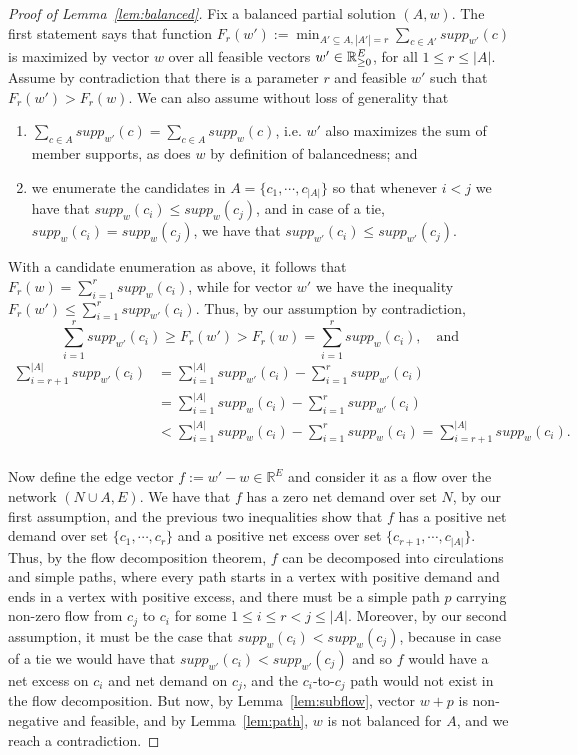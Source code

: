 \begin{proof}[Proof of Lemma~\ref{lem:balanced}]
Fix a balanced partial solution $(A,w)$. The first statement says that function 
$F_r(w'):=\min_{A'\subseteq A, |A'|=r} \sum_{c\in A'} supp_{w'}(c)$ 
is maximized by vector $w$ over all feasible vectors $w'\in\mathbb{R}_{\geq 0}^E$, for all $1\leq r\leq |A|$. 
Assume by contradiction that there is a parameter $r$ and feasible $w'$ such that $F_r(w')>F_r(w)$. 
We can also assume without loss of generality that 
\begin{enumerate}
    \item $\sum_{c\in A} supp_{w'}(c)=\sum_{c\in A} supp_{w}(c)$, i.e. $w'$ also maximizes the sum of member supports, as does $w$ by definition of balancedness; and  
    \item we enumerate the candidates in $A=\{c_1, \cdots, c_{|A|}\}$ so that whenever $i<j$ we have that $supp_w(c_i)\leq supp_w(c_j)$, and in case of a tie, $supp_w(c_i)= supp_w(c_j)$, we have that $supp_{w'}(c_i)\leq supp_{w'}(c_j)$. 
\end{enumerate}

With a candidate enumeration as above, it follows that $F_r(w)=\sum_{i=1}^r supp_w(c_i)$, while for vector $w'$ we have the inequality $F_r(w')\leq \sum_{i=1}^r supp_{w'}(c_i)$. 
Thus, by our assumption by contradiction, 
$$\sum_{i=1}^r supp_{w'}(c_i) \geq F_r(w') > F_r(w) = \sum_{i=1}^r supp_{w}(c_i), \quad \text{and}$$
\begin{align*}
    \sum_{i=r+1}^{|A|} supp_{w'}(c_i) &= \sum_{i=1}^{|A|} supp_{w'}(c_i) - \sum_{i=1}^{r} supp_{w'}(c_i) \\
    & = \sum_{i=1}^{|A|} supp_{w}(c_i) - \sum_{i=1}^{r} supp_{w'}(c_i) \\
    & < \sum_{i=1}^{|A|} supp_{w}(c_i) - \sum_{i=1}^{r} supp_{w}(c_i) 
    = \sum_{i=r+1}^{|A|} supp_{w}(c_i). \\
\end{align*}

Now define the edge vector $f:=w'-w\in\mathbb{R}^E$ and consider it as a flow over the network $(N\cup A, E)$. 
We have that $f$ has a zero net demand over set $N$, by our first assumption, and the previous two inequalities show that $f$ has a positive net demand over set $\{c_1, \cdots, c_r\}$ and a positive net excess over set $\{c_{r+1}, \cdots, c_{|A|}\}$. Thus, by the flow decomposition theorem, $f$ can be decomposed into circulations and simple paths, where every path starts in a vertex with positive demand and ends in a vertex with positive excess, and there must be a simple path $p$ carrying non-zero flow from $c_j$ to $c_i$ for some $1\leq i\leq r<j\leq |A|$. 
Moreover, by our second assumption, it must be the case that $supp_w(c_i)<supp_w(c_j)$, because in case of a tie we would have that $supp_{w'}(c_i)<supp_{w'}(c_j)$ and so $f$ would have a net excess on $c_i$ and net demand on $c_j$, and the $c_i$-to-$c_j$ path would not exist in the flow decomposition. 
But now, by Lemma~\ref{lem:subflow}, vector $w+p$ is non-negative and feasible, and by Lemma~\ref{lem:path}, $w$ is not balanced for $A$, and we reach a contradiction. 


\end{proof}
